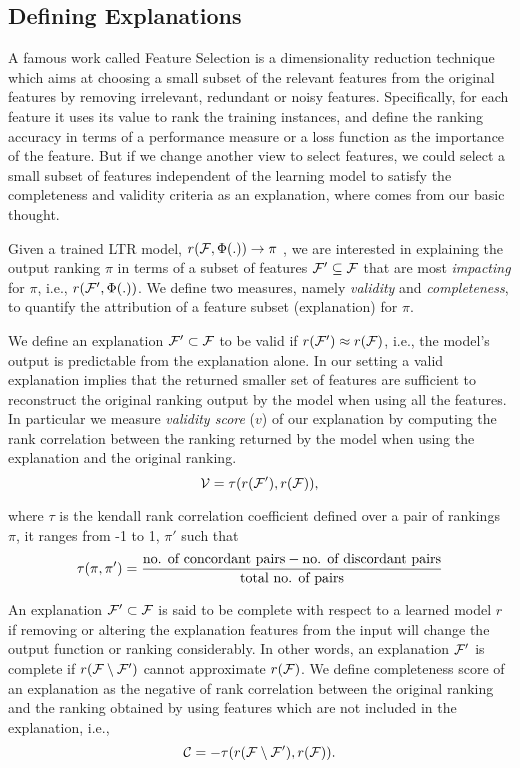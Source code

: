 \subsection{Defining Explanations}



A famous work called Feature Selection \cite{geng2007feature} is a dimensionality reduction technique which aims at choosing a small subset of the relevant features from the original features by removing irrelevant, redundant or noisy features. Specifically, for each feature it uses its value to rank the training instances, and define the ranking accuracy in terms of a performance measure or a loss function as the importance of the feature. But if we change another view to select features, we could select a small subset of features independent of the learning model to satisfy the completeness and validity criteria as an explanation, where comes from our basic thought. 

Given a trained LTR model, $r(\mathcal{F}, \Phi(.)) \to \pi$ , we are interested in explaining the output ranking $\pi$ in terms of a subset of features $\mathcal{F}' \subseteq \mathcal{F}$ that are most \textit{impacting} for $\pi$, i.e., $r(\mathcal{F}', \Phi(.))$. We define two measures, namely \emph{validity} and \emph{completeness}, to quantify the attribution of a feature subset (explanation) for $\pi$.

\begin{definition}[Validity]We define an explanation $\mathcal{F}' \subset \mathcal{F}$ to be valid if $r(\mathcal{F}')\approx r(\mathcal{F})$, i.e., the model's output is predictable from the explanation alone. In our setting a valid explanation implies that the returned smaller set of features are sufficient to reconstruct the original ranking output by the model when using all the features. In particular we measure \textit{validity score} ($v$) of our explanation by computing the rank correlation between the ranking returned by the model when using the explanation and the original ranking.
$$\mathcal{V}= \tau(r(\mathcal{F}'), r(\mathcal{F})),$$
\end{definition}

where $\tau$ is the kendall rank correlation coefficient defined over a pair of rankings $\pi$, it ranges from -1 to 1, $\pi'$ such that
$$ \tau(\pi,\pi') = {\text{no. of concordant pairs}- \text{no. of discordant pairs} \over \text{total no. of pairs}} $$

\begin{definition}[Completeness]An explanation $\mathcal{F}'\subset\mathcal{F} $ is said to be complete with respect to a learned model $r$ if removing or altering the explanation features from the input will change the output function or ranking considerably. In other words, an explanation $\mathcal{F}'$ is complete if  $r(\mathcal{F} \setminus \mathcal{F}')$ cannot approximate $r(\mathcal{F})$. We define completeness score of an explanation as the negative of rank correlation between the original ranking and the ranking obtained by using features which are not included in the explanation, i.e., 
$$ \mathcal{C}= -\tau(r(\mathcal{F} \setminus \mathcal{F}'), r(\mathcal{F})).$$

\end{definition}

